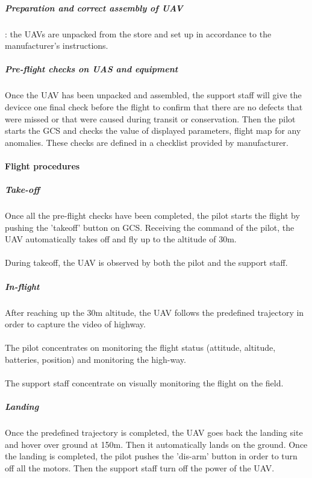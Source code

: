 \documentclass[]{article}
\begin{document}
	\subparagraph{Preparation and correct assembly of UAV}: the UAVs are unpacked from the store and set up in accordance to the manufacturer's instructions.
	
	\subparagraph{Pre-flight checks on UAS and equipment} Once the UAV has been unpacked and assembled, the support staff will give the devicce one final check before the flight to confirm that there are no defects that were missed or that were caused during transit or conservation. Then the pilot starts the GCS and checks the value of displayed parameters, flight map for any anomalies. 
	These checks are defined in a checklist provided by manufacturer. 
	
	\paragraph{Flight procedures}
	
	\subparagraph{Take-off}
	\paragraph{} Once all the pre-flight checks have been completed, the pilot starts the flight by pushing the 'takeoff' button on GCS. Receiving the command of the pilot, the UAV automatically takes off and fly up to the altitude of 30m. 
	\paragraph{} During takeoff, the UAV is observed by both the pilot and the support staff.
	
	\subparagraph{In-flight}
	\paragraph{} After reaching up the 30m altitude, the UAV follows the predefined trajectory in order to capture the video of highway.
	\paragraph{} The pilot concentrates on monitoring the flight status (attitude, altitude, batteries, position) and monitoring the high-way.  
	\paragraph{} The support staff concentrate on visually monitoring the flight on the field.
	
	\subparagraph{Landing} 
	\paragraph{} Once the predefined trajectory is completed, the UAV goes back the landing site and hover over ground at 150m. Then it automatically lands on the ground. Once the landing is completed, the pilot pushes the 'dis-arm' button in order to turn off all the motors. Then the support staff turn off the power of the UAV.
\end{document}
